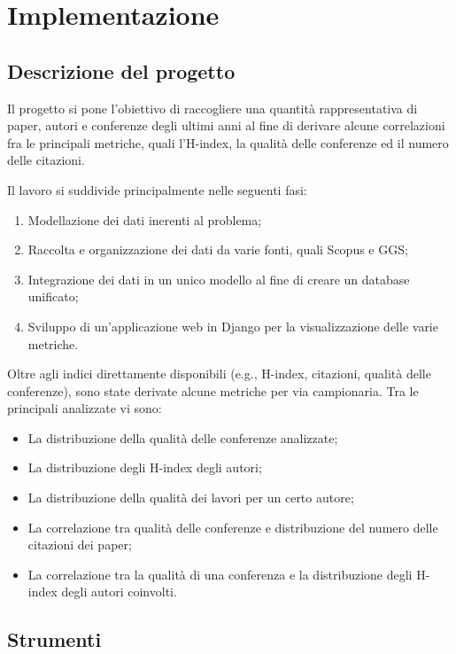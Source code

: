 \chapter{Implementazione}

\section{Descrizione del progetto}

Il progetto si pone l'obiettivo di raccogliere una quantità rappresentativa
di paper, autori e conferenze degli ultimi anni al fine di derivare alcune
correlazioni fra le principali metriche, quali l'H-index, la qualità delle
conferenze ed il numero delle citazioni.

Il lavoro si suddivide principalmente nelle seguenti fasi:
\begin{enumerate}
  \item Modellazione dei dati inerenti al problema;
  \item Raccolta e organizzazione dei dati da varie fonti, quali Scopus e GGS;
  \item Integrazione dei dati in un unico modello al fine di creare un database unificato;
  \item Sviluppo di un'applicazione web in Django per la visualizzazione delle varie metriche.
\end{enumerate}

Oltre agli indici direttamente disponibili (e.g., H-index, citazioni, qualità
delle conferenze), sono state derivate alcune metriche per via campionaria.
Tra le principali analizzate vi sono:
\begin{itemize}
  \item La distribuzione della qualità delle conferenze analizzate;
  \item La distribuzione degli H-index degli autori;
  \item La distribuzione della qualità dei lavori per un certo autore;
  \item La correlazione tra qualità delle conferenze e distribuzione del numero delle citazioni dei paper;
  \item La correlazione tra la qualità di una conferenza e la distribuzione degli H-index degli autori coinvolti.
\end{itemize}

\section{Strumenti}

